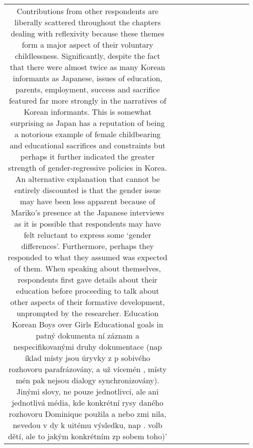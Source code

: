 \begin{table}[h!]
\begin{tabular}{|c|c|c|c|c|c|c|c|c|c|c|}
Contributions from other respondents are liberally scattered throughout the chapters dealing with reflexivity because these themes form a major aspect of their voluntary childlessness. Significantly, despite the fact that there were almost twice as many Korean informants as Japanese, issues of education, parents, employment, success and sacrifice featured far more strongly in the narratives of Korean informants. This is somewhat surprising as Japan has a reputation of being a notorious example of female childbearing and educational sacrifices and constraints but perhaps it further indicated the greater strength of gender-regressive policies in Korea. An alternative explanation that cannot be entirely discounted is that the gender issue may have been less apparent because of Mariko’s presence at the Japanese interviews as it is possible that respondents may have felt reluctant to express some ‘gender differences’. Furthermore, perhaps they responded to what they assumed was expected of them.
When speaking about themselves, respondents first gave details about their education before proceeding to talk about other aspects of their formative development, unprompted by the researcher.
Education
Korean
Boys over Girls
Educational goals in patný dokumenta ní záznam a nespecifikovanými druhy dokumentace (nap íklad místy jsou úryvky z p sobivého rozhovoru parafrázovány, a už vícemén , místy mén pak nejsou dialogy synchronizovány). Jinými slovy, ne pouze jednotlivci, ale ani jednotlivá média, kde konkrétní rysy daného rozhovoru Dominique použila a nebo zmi nila, nevedou v dy k uitému výsledku, nap . volb dětí, ale to jakým konkrétním zp sobem toho)'
  },


\end{tabular}
\end{table}

